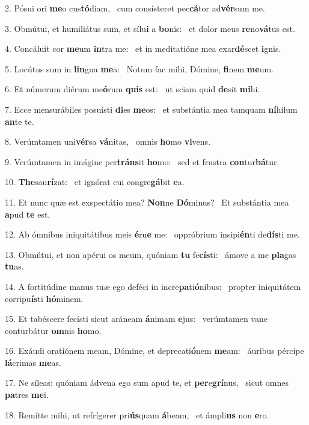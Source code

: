 2. Pósui ori \textbf{me}o cus\textbf{tó}diam, \ast\  cum consísteret pec\textbf{cá}tor ad\textbf{vér}sum me.\

3. Obmútui, et humiliátus sum, et sílu\textbf{i} a \textbf{bo}nis: \ast\  et dolor meus \textbf{re}no\textbf{vá}tus est.\

4. Concáluit cor \textbf{me}um \textbf{in}tra me: \ast\  et in meditatióne mea exar\textbf{dé}scet \textbf{i}gnis.\

5. Locútus sum in \textbf{lin}gua \textbf{me}a: \ast\  Notum fac mihi, Dómine, \textbf{fi}nem \textbf{me}um.\

6. Et númerum diérum me\textbf{ó}rum \textbf{quis} est: \ast\  ut sciam quid \textbf{de}sit \textbf{mi}hi.\

7. Ecce mensurábiles posuísti \textbf{di}es \textbf{me}os: \ast\  et substántia mea tamquam \textbf{ní}hilum \textbf{an}te te.\

8. Verúmtamen uni\textbf{vér}sa \textbf{vá}nitas, \ast\  omnis \textbf{ho}mo \textbf{vi}vens.\

9. Verúmtamen in imágine per\textbf{tráns}it \textbf{ho}mo: \ast\  sed et frustra \textbf{con}tur\textbf{bá}tur.\

10. \textbf{The}sau\textbf{rí}zat: \ast\  et ignórat cui congre\textbf{gá}bit \textbf{e}a.\

11. Et nunc quæ est exspectátio mea? \textbf{Non}ne \textbf{Dó}minus? \ast\  Et substántia mea \textbf{a}pud \textbf{te} est.\

12. Ab ómnibus iniquitátibus meis \textbf{é}ru\textbf{e} me: \ast\  oppróbrium insipi\textbf{én}ti de\textbf{dís}ti me.\

13. Obmútui, et non apérui os meum, quóniam \textbf{tu} fe\textbf{cís}ti: \ast\  ámove a me \textbf{pla}gas \textbf{tu}as.\

14. A fortitúdine manus tuæ ego deféci in incre\textbf{pa}ti\textbf{ó}nibus: \ast\  propter iniquitátem corripu\textbf{ís}ti \textbf{hó}minem.\

15. Et tabéscere fecísti sicut aráneam \textbf{á}nimam \textbf{e}jus: \ast\  verúmtamen vane conturbátur \textbf{om}nis \textbf{ho}mo.\

16. Exáudi oratiónem meam, Dómine, et deprecati\textbf{ó}nem \textbf{me}am: \ast\  áuribus pércipe \textbf{lá}crimas \textbf{me}as.\

17. Ne síleas: quóniam ádvena ego sum apud te, et \textbf{per}e\textbf{grí}nus, \ast\  sicut omnes \textbf{pa}tres \textbf{me}i.\

18. Remítte mihi, ut refrígerer pri\textbf{ús}quam \textbf{á}beam, \ast\  et ámpli\textbf{us} non \textbf{e}ro.\

